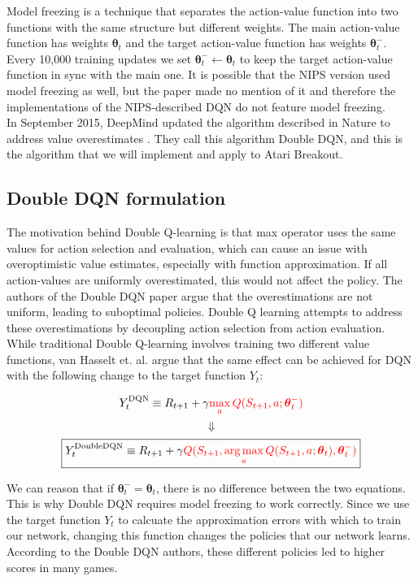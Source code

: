 \documentclass{article}
\DeclareMathOperator*{\argmax}{arg\,max}
\begin{document}
Model freezing is a technique that separates the action-value function into two functions with the same structure but different weights. The main action-value function has weights $\boldsymbol{\theta}_t$ and the target action-value function has weights $\boldsymbol{\theta}_t^-$. Every 10,000 training updates we set $\boldsymbol{\theta}_t^- \leftarrow \boldsymbol{\theta}_t$ to keep the target action-value function in sync with the main one. It is possible that the NIPS version used model freezing as well, but the paper made no mention of it and therefore the implementations of the NIPS-described DQN do not feature model freezing. \\

In September 2015, DeepMind updated the algorithm described in Nature to address value overestimates \cite{dmdoubl}. They call this algorithm Double DQN, and this is the algorithm that we will implement and apply to Atari Breakout.

\subsection{Double DQN formulation}
  The motivation behind Double Q-learning is that max operator uses the same values for action selection and evaluation, which can cause an issue with overoptimistic value estimates, especially with function approximation. If all action-values are uniformly overestimated, this would not affect the policy. The authors of the Double DQN paper argue that the overestimations are not uniform, leading to suboptimal policies. Double Q learning attempts to address these overestimations by decoupling action selection from action evaluation. While traditional Double Q-learning involves training two different value functions, van Hasselt et. al. argue that the same effect can be achieved for DQN with the following change to the target function $Y_t$:

  \[Y_t^{\textrm{DQN}} \equiv R_{t+1} + \gamma \textcolor{red}{\max_{a} Q(S_{t+1},a;\boldsymbol{\theta}_t^-)} \]
  \[ \Downarrow \]
  \[\boxed{Y_t^{\textrm{DoubleDQN}} \equiv R_{t+1} + \gamma \textcolor{red}{Q(S_{t+1},\argmax_a Q(S_{t+1},a;\boldsymbol{\theta}_t),\boldsymbol{\theta}_t^-)}} \]

  We can reason that if $\boldsymbol{\theta}_t^- = \boldsymbol{\theta}_t$, there is no difference between the two equations. This is why Double DQN requires model freezing to work correctly. Since we use the target function $Y_t$ to calcuate the approximation errors with which to train our network, changing this function changes the policies that our network learns. According to the Double DQN authors, these different policies led to higher scores in many games.
\end{document}
